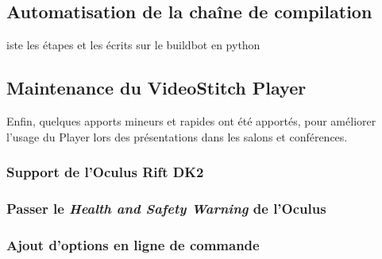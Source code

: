 \subsection{Automatisation de la chaîne de compilation}
iste les étapes et les écrits sur le buildbot en python 

\subsection{Maintenance du VideoStitch Player}
Enfin, quelques apports mineurs et rapides ont été apportés, pour améliorer l'usage
du Player lors des présentations dans les salons et conférences.
\subsubsection{Support de l'Oculus Rift DK2}

\subsubsection{Passer le \textit{Health and Safety Warning} de l'Oculus}

\subsubsection{Ajout d'options en ligne de commande}
